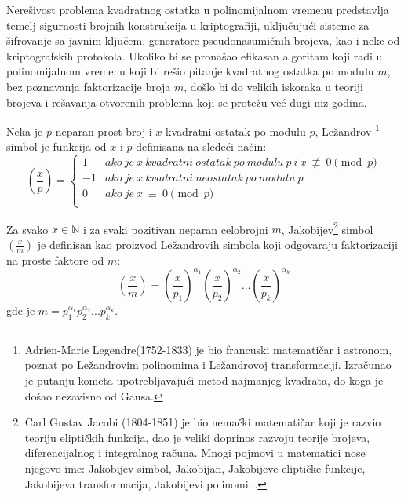 Nerešivost problema kvadratnog ostatka u polinomijalnom vremenu predstavlja temelj sigurnosti brojnih konstrukcija u kriptografiji, uključujući sisteme za šifrovanje sa javnim ključem, generatore pseudonasumičnih brojeva, kao i neke od kriptografskih protokola. Ukoliko bi se pronašao efikasan algoritam koji radi u polinomijalnom vremenu koji bi rešio pitanje kvadratnog ostatka po modulu $m$, bez poznavanja faktorizacije broja $m$, došlo bi do velikih iskoraka u teoriji brojeva i rešavanja otvorenih problema koji se protežu već dugi niz godina.

\begin{definition}
	\label{defLez}
	Neka je $p$ neparan prost broj i $x$ kvadratni ostatak po modulu $p$, Ležandrov \footnote{\textenglish{Adrien-Marie Legendre(1752-1833)} je bio francuski matematičar i astronom, poznat po Ležandrovim polinomima i Ležandrovoj transformaciji. Izračunao je putanju kometa upotrebljavajući metod najmanjeg kvadrata, do koga je došao nezavisno od Gausa.} simbol je funkcija od $x$ i $p$ definisana na sledeći način:
	\[  \left ( \frac{x}{p} \right ) = \left\{
	\begin{array}{ll}
		1 & ako\ je\ x\ kvadratni\ ostatak\ po\ modulu\ p\ i\ x\ \not\equiv\ 0\pmod p \\
		-1 & ako\ je\ x\ kvadratni\ neostatak\ po\ modulu\ p\\
		0 & ako\ je\ x\ \equiv\ 0\pmod p  \\
	\end{array} 
	\right. \]
\end{definition}

\begin{definition}
	Za svako $x \in \mathbb{N}$ i za svaki pozitivan neparan celobrojni $m$, Jakobijev\footnote{\textenglish{Carl Gustav Jacobi (1804-1851)} je bio nemački matematičar koji je razvio teoriju eliptičkih funkcija, dao je veliki doprinos razvoju teorije brojeva, diferencijalnog i integralnog računa. Mnogi pojmovi u matematici nose njegovo ime: Jakobijev simbol, Jakobijan, Jakobijeve eliptičke funkcije, Jakobijeva transformacija, Jakobijevi polinomi...} simbol $\left ( \frac{x}{m} \right )$ je definisan kao proizvod Ležandrovih simbola koji odgovaraju faktorizaciji na proste faktore od $m$:
	$$\left (\frac{x}{m} \right )= \left ( \frac{x}{p_{1}} \right ) ^{\alpha_{1}} \left ( \frac{x}{p_{2}} \right ) ^{\alpha_{2}} \dots \left ( \frac{x}{p_{k}} \right ) ^{\alpha_{k}}$$
	gde je $m = p_{1}^{\alpha_{1}}p_{2}^{\alpha_{2}}...p_{k}^{\alpha_{k}}$.
\end{definition}

